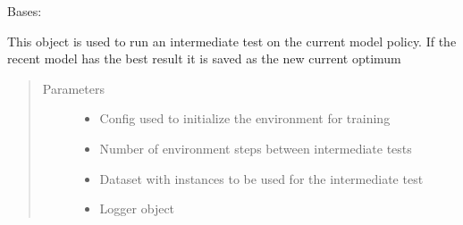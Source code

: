 \documentclass[letterpaper,10pt,english]{sphinxmanual}
\begin{document}
\begin{fulllineitems}
\label{\detokenize{agents.reinforcement_learning:agents.intermediate_test.IntermediateTest}}
\sphinxAtStartPar
Bases: 

\sphinxAtStartPar
This object is used to run an intermediate test on the current model policy.
If the recent model has the best result it is saved as the new current optimum
\begin{quote}\begin{description}
\item[{Parameters}] \leavevmode\begin{itemize}
\item {} 
\sphinxAtStartPar
{} \textendash{} Config used to initialize the environment for training

\item {} 
\sphinxAtStartPar
{} \textendash{} Number of environment steps between intermediate tests

\item {} 
\sphinxAtStartPar
{} \textendash{} Dataset with instances to be used for the intermediate test

\item {} 
\sphinxAtStartPar
{} \textendash{} Logger object

\end{itemize}

\end{description}\end{quote}

\begin{fulllineitems}
\label{\detokenize{agents.reinforcement_learning:agents.intermediate_test.IntermediateTest.__init__}}
\end{fulllineitems}


\end{fulllineitems}
\end{document}
